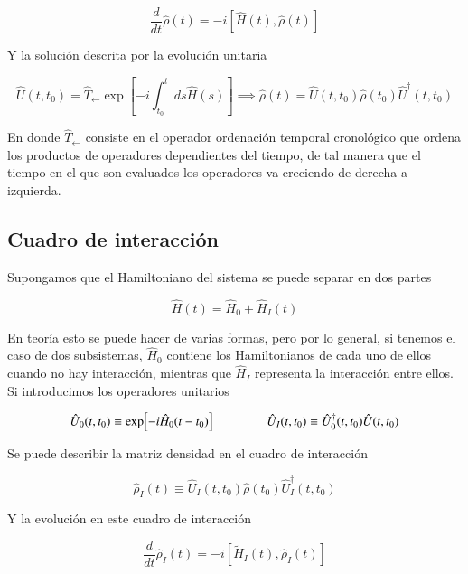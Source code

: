\begin{equation*}
    \frac{d}{dt}\hat{\rho}(t) = -i[\hat{H}(t),\hat{\rho}(t)]
\end{equation*}

Y la solución descrita por la evolución unitaria 

\begin{equation*}
    \hat{U}(t,t_{0}) = \hat{T}_{\leftarrow} \exp \left[ -i \int_{t_{0}}^{t}ds \hat{H}(s) \right] \implies \hat{\rho}(t) = \hat{U}(t,t_{0})\hat{\rho}(t_{0})\hat{U}^{\dagger}(t,t_{0})
\end{equation*}

En donde $\hat{T}_{\leftarrow}$ consiste en el operador ordenación temporal cronológico que ordena los productos de operadores dependientes del tiempo, de tal manera que el tiempo en el que son evaluados los operadores va creciendo de derecha a izquierda.

\subsection{Cuadro de interacción}
Supongamos que el Hamiltoniano del sistema se puede separar en dos partes

\begin{equation*}
    \hat{H}(t) = \hat{H}_{0} + \hat{H}_{I}(t)
\end{equation*}

En teoría esto se puede hacer de varias formas, pero por lo general, si tenemos el caso de dos subsistemas, $\hat{H}_{0}$ contiene los Hamiltonianos de cada uno de ellos cuando no hay interacción, mientras que $\hat{H}_{I}$ representa la interacción entre ellos. Si introducimos los operadores unitarios

\begin{equation*}
    \hat{U}_{0}(t,t_{0}) \equiv \exp[-i\hat{H}_{0}(t-t_{0}) ]  \hspace{15mm} \hat{U}_{I}(t,t_0) \equiv \hat{U}^{\dagger}_{0}(t,t_{0})\hat{U}(t,t_{0})
\end{equation*}

Se puede describir la matriz densidad en el cuadro de interacción

\begin{equation*}
    \hat{\rho}_{I}(t) \equiv \hat{U}_{I}(t,t_{0})\hat{\rho}(t_{0})\hat{U}^{\dagger}_{I}(t,t_{0})
\end{equation*}

Y la evolución en este cuadro de interacción

\begin{equation}
    \frac{d}{dt}\hat{\rho}_{I}(t) = -i[\tilde{H}_{I}(t), \hat{\rho}_{I}(t)]
    \label{sec11:interactionp}
\end{equation}

